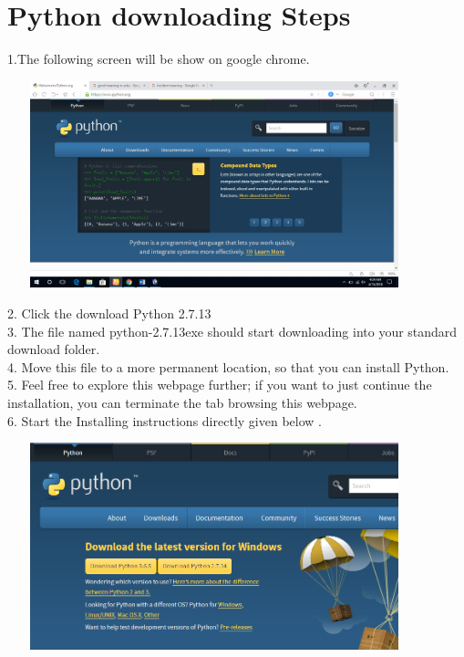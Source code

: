 \documentclass[11pt]{article}            %
\begin{document}
\section{Python downloading Steps }  
      

   
1.The following screen will be show on google chrome.\\

\begin{center}
  \includegraphics[width=12cm,height=6cm,keepaspectratio]{9.png}\\
\end{center}

2. Click the download Python 2.7.13\\ 
3. The file named python-2.7.13exe should start downloading into your standard download folder. \\
4. Move this file to a more permanent location, so that you can install Python.\\
5. Feel free to explore this webpage further; if you want to just continue the installation, you can terminate the tab browsing this webpage.\\
6. Start the Installing instructions directly given below .\\

\begin{center}
  \includegraphics[width=12cm,height=6cm,keepaspectratio]{1.png}\\
\end{center}
\end{document}
